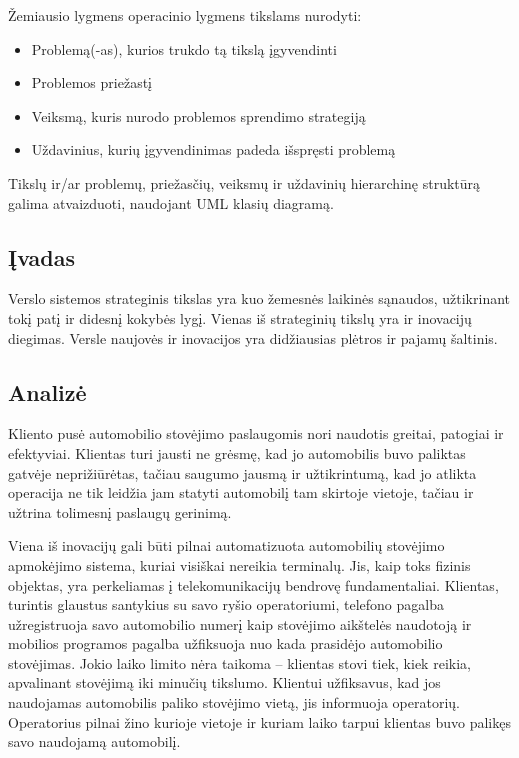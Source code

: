 \documentclass[10pt]{IEEEtran}
\begin{document}
            Žemiausio lygmens operacinio lygmens tikslams nurodyti:

            \begin{itemize}
                \item Problemą(-as), kurios trukdo tą tikslą įgyvendinti
                \item Problemos priežastį
                \item Veiksmą, kuris nurodo problemos sprendimo strategiją
                \item Uždavinius, kurių įgyvendinimas padeda išspręsti problemą
            \end{itemize}

            Tikslų ir/ar problemų, priežasčių, veiksmų ir uždavinių hierarchinę struktūrą galima atvaizduoti, naudojant UML klasių diagramą.

        \subsection{Įvadas}

            Verslo sistemos strateginis tikslas yra kuo žemesnės laikinės sąnaudos, užtikrinant tokį patį ir didesnį kokybės lygį. Vienas iš strateginių tikslų yra ir inovacijų diegimas. Versle naujovės ir inovacijos yra didžiausias plėtros ir pajamų šaltinis.

        \subsection{Analizė}

            Kliento pusė automobilio stovėjimo paslaugomis nori naudotis greitai, patogiai ir efektyviai. Klientas turi jausti ne grėsmę, kad jo automobilis buvo paliktas gatvėje neprižiūrėtas, tačiau saugumo jausmą ir užtikrintumą, kad jo atlikta operacija ne tik leidžia jam statyti automobilį tam skirtoje vietoje, tačiau ir užtrina tolimesnį paslaugų gerinimą.

            Viena iš inovacijų gali būti pilnai automatizuota automobilių stovėjimo apmokėjimo sistema, kuriai visiškai nereikia terminalų. Jis, kaip toks fizinis objektas, yra perkeliamas į telekomunikacijų bendrovę fundamentaliai. Klientas, turintis glaustus santykius su savo ryšio operatoriumi, telefono pagalba užregistruoja savo automobilio numerį kaip stovėjimo aikštelės naudotoją ir mobilios programos pagalba užfiksuoja nuo kada prasidėjo automobilio stovėjimas. Jokio laiko limito nėra taikoma -- klientas stovi tiek, kiek reikia, apvalinant stovėjimą iki minučių tikslumo. Klientui užfiksavus, kad jos naudojamas automobilis paliko stovėjimo vietą, jis informuoja operatorių. Operatorius pilnai žino kurioje vietoje ir kuriam laiko tarpui klientas buvo palikęs savo naudojamą automobilį.
\end{document}
